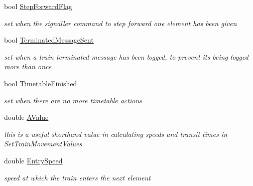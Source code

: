 \begin{DoxyCompactItemize}
bool \mbox{\hyperlink{class_t_train_a0f044ad19728cee6dd0b6baadec4648b}{Step\+Forward\+Flag}}
\begin{DoxyCompactList}\small\item\em set when the signaller command to step forward one element has been given \end{DoxyCompactList}\item 
\mbox{\label{class_t_train_aa714e9f320349edfe76fc9ac3ae3e20a}} 
bool \mbox{\hyperlink{class_t_train_aa714e9f320349edfe76fc9ac3ae3e20a}{Terminated\+Message\+Sent}}
\begin{DoxyCompactList}\small\item\em set when a \textquotesingle{}train terminated\textquotesingle{} message has been logged, to prevent its being logged more than once \end{DoxyCompactList}\item 
\mbox{\label{class_t_train_a9e3744afb10713ef0b88f6fabb120236}} 
bool \mbox{\hyperlink{class_t_train_a9e3744afb10713ef0b88f6fabb120236}{Timetable\+Finished}}
\begin{DoxyCompactList}\small\item\em set when there are no more timetable actions \end{DoxyCompactList}\item 
\mbox{\label{class_t_train_a49612fd01b9450008b99d9fd66ac7583}} 
double \mbox{\hyperlink{class_t_train_a49612fd01b9450008b99d9fd66ac7583}{A\+Value}}
\begin{DoxyCompactList}\small\item\em this is a useful shorthand value in calculating speeds and transit times in Set\+Train\+Movement\+Values \end{DoxyCompactList}\item 
\mbox{\label{class_t_train_ae132daaee23376980818479528f27e2f}} 
double \mbox{\hyperlink{class_t_train_ae132daaee23376980818479528f27e2f}{Entry\+Speed}}
\begin{DoxyCompactList}\small\item\em speed at which the train enters the next element \end{DoxyCompactList}\item 
\mbox{\label{class_t_train_a05c926d79cbda85036d8d746131c3aef}} 

\end{DoxyCompactItemize}
